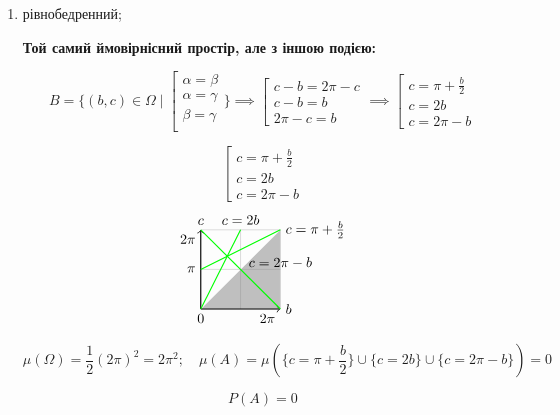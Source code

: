 \begin{enumerate}
	\item рівнобедренний;
	
	\textbf{Той самий ймовірнісний простір, але з іншою подією:}

	$$
	B = \{ (b,c) \in \Omega \;|\;
	\left[\begin{array}{c}
		\alpha = \beta \\
		\alpha = \gamma \\
		\beta = \gamma \\
	\end{array}\right. \} \implies
	\left[\begin{array}{c}
		c - b = 2\pi - c \\
		c - b = b \\
		2\pi - c = b
	\end{array}\right. \implies
	\left[\begin{array}{c}
		c = \pi + \frac{b}{2} \\
		c = 2b \\
		c = 2\pi - b
	\end{array}\right.
	$$
	\begin{multicols}{2}
		$$
		\left[\begin{array}{c}
			c = \pi + \frac{b}{2} \\
			c = 2b \\
			c = 2\pi - b
		\end{array}\right.$$
		\columnbreak
		$$
		\begin{tikzpicture}
			\filldraw[fill=black!25, draw=black!0] (0,0) -- (2,2) -- (2,0) -- cycle;
			\draw[step=1cm,gray,very thin] (0,0) grid (2,2);
			\draw[thick,->] (0,0) node[anchor=north] {$0$} -- (2,0) node[anchor=west] {$b$} node[anchor=north east] {$2\pi$};
			\draw[thick,->] (0,0) -- (0,2) node[anchor=south] {$c$} node[anchor=north east] {$2\pi$};
			\draw[thick, green] (0,2) -- (2,0) node[above=9mm, black] {$c = 2\pi - b$};
			\draw[thick, green] (0,1) node[left, black] {$\pi$} -- (2,2) node[right, black] { $c = \pi + \frac{b}{2}$}; 
			\draw[thick, green] (0,0) -- (1,2) node[above, black] {$c = 2b$}; 
		\end{tikzpicture}
		$$
	\end{multicols}
	

	$$\mu(\Omega) = \frac{1}{2} (2\pi)^2 = 2\pi^2;\quad
	\mu(A) = \mu(\{c=\pi+\frac{b}{2}\} \cup \{c=2b\} \cup \{c=2\pi-b\}) = 0$$
	\begin{mdframed}[style=ans]
		$$P(A) = 0 $$
	\end{mdframed}
\end{enumerate}


